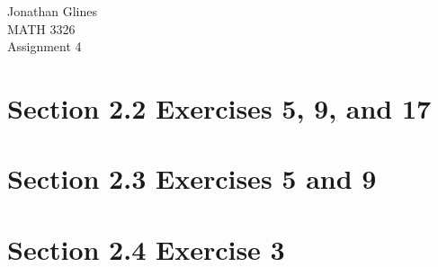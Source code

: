 \documentclass[12pt]{article}
\begin{document}
\begin{flushright}
{\Large
Jonathan Glines \\
MATH 3326 \\
Assignment 4 \\
}
\end{flushright}
\section*{Section 2.2 Exercises 5, 9, and 17}
\section*{Section 2.3 Exercises 5 and 9}
\section*{Section 2.4 Exercise 3}
\end{document}
